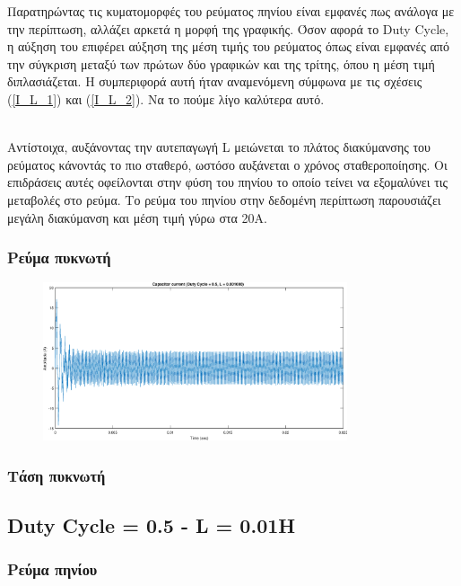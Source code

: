 \noindent
Παρατηρώντας τις κυματομορφές του ρεύματος πηνίου είναι εμφανές πως ανάλογα με την περίπτωση, αλλάζει αρκετά η μορφή της γραφικής. Όσον αφορά το Duty Cycle, η αύξηση του επιφέρει αύξηση της μέση τιμής του ρεύματος όπως είναι εμφανές από την σύγκριση μεταξύ των πρώτων δύο γραφικών και της τρίτης, όπου η μέση τιμή διπλασιάζεται. Η συμπεριφορά αυτή ήταν αναμενόμενη σύμφωνα με τις σχέσεις (\ref{I_L_1}) και (\ref{I_L_2}). Να το πούμε λίγο καλύτερα αυτό.

\noindent\\
Αντίστοιχα, αυξάνοντας την αυτεπαγωγή L μειώνεται το πλάτος διακύμανσης του ρεύματος κάνοντάς το πιο σταθερό, ωστόσο αυξάνεται ο χρόνος σταθεροποίησης. Οι επιδράσεις αυτές οφείλονται στην φύση του πηνίου το οποίο τείνει να εξομαλύνει τις μεταβολές στο ρεύμα.
\noindent
Το ρεύμα του πηνίου στην δεδομένη περίπτωση παρουσιάζει μεγάλη διακύμανση και μέση τιμή γύρω στα 20Α.\\

\subsubsection{Ρεύμα πυκνωτή}
\begin{figure}[h!]
	\centering
	\includegraphics[width=0.8\textwidth]{Images/I_C_05_1}
\end{figure}

\clearpage


\subsubsection{Τάση πυκνωτή}
\subsection{Duty Cycle = 0.5  -  L = 0.01H}
\subsubsection{Ρεύμα πηνίου}
